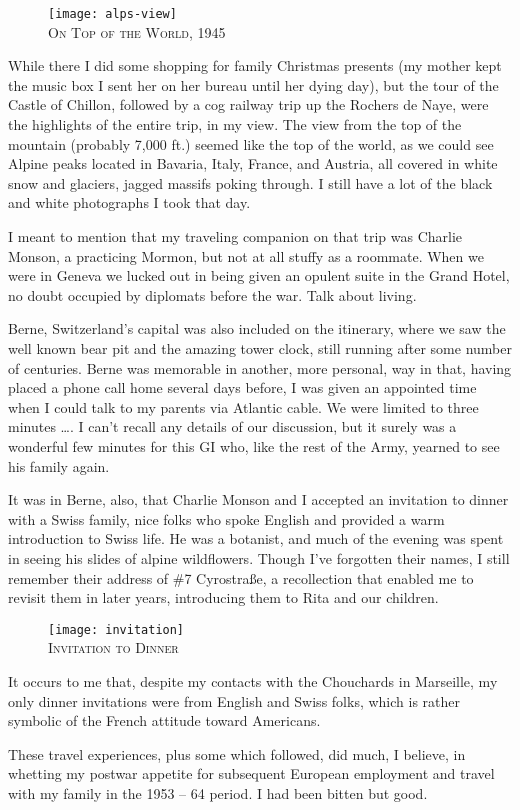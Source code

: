 \documentclass[../m3y]{subfiles}
\begin{document}
\begin{figure}[h]
\centering
\texttt{[image: alps-view]}\\
\medskip
{\newtimes\textsc{On Top of the World, 1945}}
\end{figure}

While there I did some shopping for family Christmas presents (my mother kept the music box I sent her on her bureau until her dying day), but the tour of the Castle of Chillon, followed by a cog railway trip up the Rochers de Naye, were the highlights of the entire trip, in my view. The view from the top of the mountain (probably 7,000 ft.) seemed like the top of the world, as we could see Alpine peaks located in Bavaria, Italy, France, and Austria, all covered in white snow and glaciers, jagged massifs poking through. I still have a lot of the black and white photographs I took that day.

I meant to mention that my traveling companion on that trip was Charlie Monson, a practicing Mormon, but not at all stuffy as a roommate. When we were in Geneva we lucked out in being given an opulent suite in the Grand Hotel, no doubt occupied by diplomats before the war. Talk about living.

Berne, Switzerland's capital was also included on the itinerary, where we saw the well known bear pit and the amazing tower clock, still running after some number of centuries. Berne was memorable in another, more personal, way in that, having placed a phone call home several days before, I was given an appointed time when I could talk to my parents via Atlantic cable. We were limited to three minutes \ldots\@. I can't recall any details of our discussion, but it surely was a wonderful few minutes for this GI who, like the rest of the Army, yearned to see his family again.

It was in Berne, also, that Charlie Monson and I accepted an invitation to dinner with a Swiss family, nice folks who spoke English and provided a warm introduction to Swiss life. He was a botanist, and much of the evening was spent in seeing his slides of alpine wildflowers. Though I've forgotten their names, I still remember their address of \#7 Cyrostra{\ss}e, a recollection that enabled me to revisit them in later years, introducing them to Rita and our children.

\begin{figure}
\centering
\texttt{[image: invitation]}\\
\medskip
{\newtimes\textsc{Invitation to Dinner}}
\end{figure}

It occurs to me that, despite my contacts with the Chouchards in Marseille, my only dinner invitations were from English and Swiss folks, which is rather symbolic of the French attitude toward Americans.

These travel experiences, plus some which followed, did much, I believe, in whetting my postwar appetite for subsequent European employment and travel with my family in the 1953 -- 64 period. I had been bitten but good.
\end{document}
